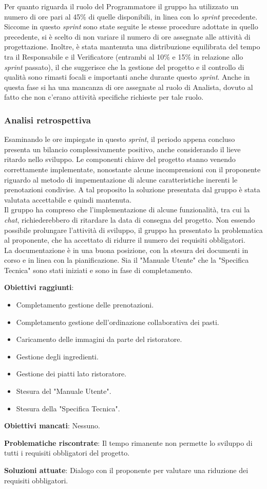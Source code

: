 Per quanto riguarda il ruolo del Programmatore il gruppo ha utilizzato un numero di ore pari al 45\% di quelle disponibili, in linea con lo \textit{sprint} precedente.
Siccome in questo \textit{sprint} sono state seguite le stesse procedure adottate in quello precedente, si è scelto di non variare il numero di ore assegnate alle attività di progettazione.
Inoltre, è stata mantenuta una distribuzione equilibrata del tempo tra il Responsabile e il Verificatore (entrambi al 10\% e 15\% in relazione allo \textit{sprint} passato), il che suggerisce che la gestione del progetto e il controllo di qualità sono rimasti focali e importanti anche durante questo \textit{sprint}.
Anche in questa fase si ha una mancanza di ore assegnate al ruolo di Analista, dovuto al fatto che non c'erano attività specifiche richieste per tale ruolo.


\subsubsection{Analisi retrospettiva}
Esaminando le ore impiegate in questo \textit{sprint}, il periodo appena concluso presenta un bilancio complessivamente positivo, anche considerando il lieve ritardo nello sviluppo.
Le componenti chiave del progetto stanno venendo correttamente implementate, nonostante alcune incomprensioni con il proponente riguardo al metodo di impementazione di alcune caratteristiche inerenti le prenotazioni condivise.
A tal proposito la soluzione presentata dal gruppo è stata valutata accettabile e quindi mantenuta.\\
Il gruppo ha compreso che l'implementazione di alcune funzionalità, tra cui la \textit{chat}, richiederebbero di ritardare la data di consegna del progetto.
Non essendo possibile prolungare l'attività di sviluppo, il gruppo ha presentato la problematica al proponente, che ha accettato di ridurre il numero dei requisiti obbligatori. \\
La documentazione è in una buona posizione, con la stesura dei documenti in corso e in linea con la pianificazione. Sia il "Manuale Utente" che la "Specifica Tecnica" 
sono stati iniziati e sono in fase di completamento.

\textbf{Obiettivi raggiunti}:
\begin{itemize}
	\item Completamento gestione delle prenotazioni.
	\item Completamento gestione dell'ordinazione collaborativa dei pasti.
	\item Caricamento delle immagini da parte del ristoratore.
	\item Gestione degli ingredienti.
	\item Gestione dei piatti lato ristoratore.
	\item Stesura del "Manuale Utente".
	\item Stesura della "Specifica Tecnica".
\end{itemize}


\textbf{Obiettivi mancati}: Nessuno.

\textbf{Problematiche riscontrate}: Il tempo rimanente non permette lo sviluppo di tutti i requisiti obbligatori del progetto.

\textbf{Soluzioni attuate}: Dialogo con il proponente per valutare una riduzione dei requisiti obbligatori.